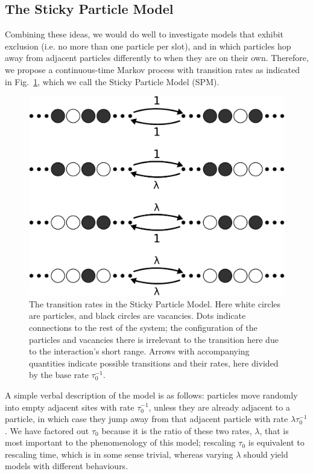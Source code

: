 \subsection{The Sticky Particle Model}
Combining these ideas, we would do well to investigate models that exhibit exclusion (i.e. no more than one 
particle per slot), and in which particles hop away from adjacent particles 
differently to when they are on their 
own. Therefore, we propose a continuous-time Markov process with transition rates as indicated in
Fig.~\ref{fig:transRates}, which we call the Sticky Particle Model (SPM).
\begin{figure} \caption[The transition rates in the Sticky Particle Model.]{The transition rates in the Sticky Particle Model. Here white circles are particles, and black circles are vacancies. Dots indicate connections to the rest of 
the system; the configuration of the particles and vacancies there is irrelevant to the transition here due to the
interaction's short range. Arrows with accompanying quantities indicate possible transitions and their rates, here 
divided by the base rate $\tau_0^{-1}$.} 
\label{fig:transRates}
\begin{center}
\includegraphics[width=1.0\textwidth]{intro/images/ratesDB}
\end{center}
\end{figure}
A simple verbal description of the model is as follows: particles move randomly into empty adjacent sites with rate 
$\tau_0^{-1}$, unless they are already adjacent to a particle, in which case they jump away from that adjacent
particle with rate $\lambda \tau_0^{-1}$. We have factored out $\tau_0$ because it is the ratio of these two rates,
$\lambda$, that is most important to the phenomenology of this model; rescaling $\tau_0$ is equivalent to 
rescaling time, which is in some sense trivial, whereas varying $\lambda$ should yield models with different behaviours.

